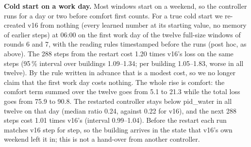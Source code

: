 \documentclass{article}
\begin{document}
\textbf{Cold start on a work day.} Most windows start on a weekend, so the controller runs for a day or two before
comfort first counts. For a true cold start we re-created v16 from nothing (every learned number at its starting value,
no memory of earlier steps) at 06:00 on the first work day of the twelve full-size windows of rounds 6 and 7, with the
reading rules timestamped before the runs (post hoc, as above). The 288 steps from the restart cost 1.20 times v16's
loss on the same steps (95\,\% interval over buildings 1.09--1.34; per building 1.05--1.83, worse in all twelve). By the
rule written in advance that is a modest cost, so we no longer claim that the first work day costs nothing. The whole
rise is comfort: the comfort term summed over the twelve goes from 5.1 to 21.3 while the total loss goes from 75.9 to
90.8. The restarted controller stays below pid\_water in all twelve on that day (median ratio 0.24, against 0.22 for
v16), and the next 288 steps cost 1.01 times v16's (interval 0.99--1.04). Before the restart each run matches v16 step for
step, so the building arrives in the state that v16's own weekend left it in; this is not a hand-over from another
controller.
\end{document}
